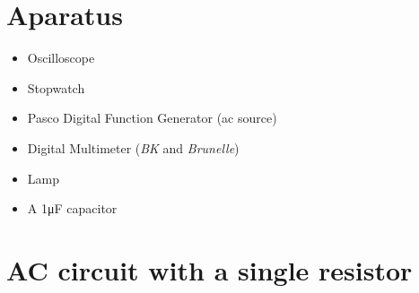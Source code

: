 \documentclass{report}
\begin{document}
\chapter{Aparatus}
\begin{itemize}[label=\textbullet]
\item Oscilloscope
    \item Stopwatch
    \item Pasco Digital Function Generator (ac source)
    \item Digital Multimeter  (\textit{BK} and \textit{Brunelle}) 
    \item Lamp
    \item A 1\si{\micro\farad} capacitor
\end{itemize}

\chapter{ AC circuit with a single resistor}
\end{document}
